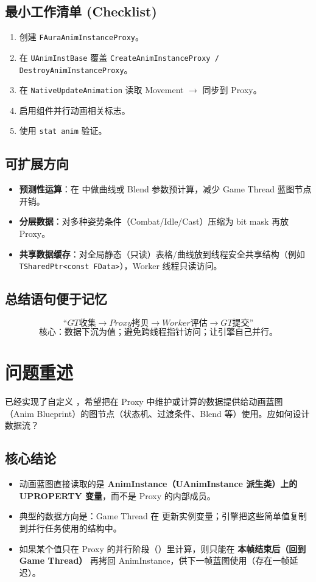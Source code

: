 \documentclass[10pt,openright,oneside,CJKmath]{MyBook}
\begin{document}
\subsection{最小工作清单 (Checklist)}
\begin{enumerate}
  \item 创建 \texttt{FAuraAnimInstanceProxy}。
  \item 在 \texttt{UAnimInstBase} 覆盖 \texttt{CreateAnimInstanceProxy / DestroyAnimInstanceProxy}。
  \item 在 \texttt{NativeUpdateAnimation} 读取 Movement $\rightarrow$ 同步到 Proxy。
  \item 启用组件并行动画相关标志。
  \item 使用 \texttt{stat anim} 验证。
\end{enumerate}

\subsection{可扩展方向}
\begin{itemize}
  \item \textbf{预测性运算}：在  中做曲线或 Blend 参数预计算，减少 Game Thread 蓝图节点开销。
  \item \textbf{分层数据}：对多种姿势条件（Combat/Idle/Cast）压缩为 bit mask 再放 Proxy。
  \item \textbf{共享数据缓存}：对全局静态（只读）表格/曲线放到线程安全共享结构（例如 \texttt{TSharedPtr<const FData>}），Worker 线程只读访问。
\end{itemize}

\subsection{总结语句便于记忆}
\[
{“GT 收集  \rightarrow Proxy 拷贝  \rightarrow Worker 评估  \rightarrow GT 提交”}
\]
\[
{核心：数据下沉为值；避免跨线程指针访问；让引擎自己并行。}
\]
\section{问题重述}
已经实现了自定义 ，希望把在 Proxy 中维护或计算的数据提供给动画蓝图（Anim Blueprint）的图节点（状态机、过渡条件、Blend 等）使用。应如何设计数据流？

\subsection{核心结论}
\begin{itemize}
  \item 动画蓝图直接读取的是 \textbf{AnimInstance（UAnimInstance 派生类）上的 UPROPERTY 变量}，而不是 Proxy 的内部成员。
  \item 典型的数据方向是：Game Thread 在  更新实例变量；引擎把这些简单值复制到并行任务使用的结构中。
  \item 如果某个值只在 Proxy 的并行阶段（）里计算，则只能在 \textbf{本帧结束后（回到 Game Thread）} 再拷回 AnimInstance，供下一帧蓝图使用（存在一帧延迟）。
\end{itemize}
\end{document}
